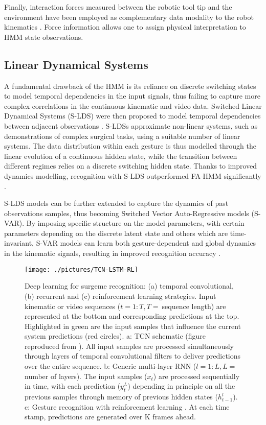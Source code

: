 \documentclass[journal]{IEEEtran}
\begin{document}
Finally, interaction forces measured between the robotic tool tip and the environment have been employed as complementary data modality to the robot kinematics \cite{Selvaggio2018}. Force information allows one to assign physical interpretation to HMM state observations. 

\subsection{Linear Dynamical Systems}

A fundamental drawback of the HMM is its reliance on discrete switching states to model temporal dependencies in the input signals, thus failing to capture more complex correlations in the continuous kinematic and video data. Switched Linear Dynamical Systems (S-LDS) were then proposed to model temporal dependencies between adjacent observations \cite{Varadarajan2011}. S-LDSs approximate non-linear systems, such as demonstrations of complex surgical tasks, using a suitable number of linear systems. The data distribution within each gesture is thus modelled through the linear evolution of a continuous hidden state, while the transition between different regimes relies on a discrete switching hidden state. Thanks to improved dynamics modelling, recognition with S-LDS outperformed FA-HMM significantly \cite{Varadarajan2011}.

S-LDS models can be further extended to capture the dynamics of past observations samples, thus becoming Switched Vector Auto-Regressive models (S-VAR). By imposing specific structure on the model parameters, with certain parameters depending on the discrete latent state and others which are time-invariant, S-VAR models can learn both gesture-dependent and global dynamics in the kinematic signals, resulting in improved recognition accuracy \cite{Varadarajan2011VAR}.


\begin{figure*}[t!]
	\centering
	\texttt{[image: ./pictures/TCN-LSTM-RL]}
	\caption[Deep Learning]{Deep learning for surgeme recognition: (a) temporal convolutional, (b) recurrent and (c) reinforcement learning strategies.
    Input kinematic or video sequences ($t=1:T, T=\ $sequence length) are represented at the bottom and corresponding predictions at the top. Highlighted in green are the input samples that influence the current system predictions (red circles).
	a: TCN schematic (figure reproduced from \cite{Lea2017tcnCVPR}). All input samples are processed simultaneously through layers of temporal convolutional filters to deliver predictions over the entire sequence. b: Generic multi-layer RNN ($l=1:L, L=\ $number of layers). The input samples ($x_t$) are processed sequentially in time, with each prediction ($y_t^L$) depending in principle on all the previous samples through memory of previous hidden states ($h_{t-1}^l$). c: Gesture recognition with reinforcement learning \cite{Liu2018}. At each time stamp, predictions are generated over K frames ahead.}
	\label{fig:TCN-LSTM-RL}
\end{figure*}
\end{document}
